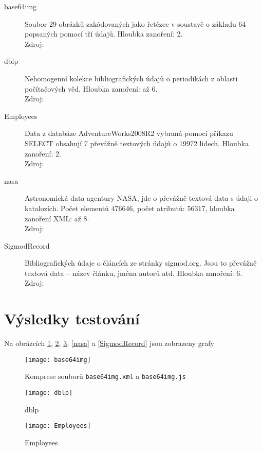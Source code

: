 \begin{description}
\item[base64img]Soubor 29 obrázků zakódovaných jako řetězec v soustavě o základu 64 popsaných pomocí tří údajů. Hloubka zanoření: 2.\\
Zdroj: %
\item[dblp]
Nehomogenní kolekce bibliografických údajů o periodikách z oblasti počítačových věd. Hloubka zanoření: až 6.\\
Zdroj: %
\item[Employees]
Data z databáze AdventureWorks2008R2 vybraná pomocí příkazu SELECT obsahují 7 převážně textových údajů o 19972 lidech. Hloubka zanoření: 2.\\
Zdroj: %
\item[nasa]
Astronomická data agentury NASA, jde o převážně textová data s údaji o katalozích. Počet elementů 476646, počet atributů: 56317, hloubka zanoření XML: až 8.\\
Zdroj: %
\item[SigmodRecord]
Bibliografických údaje o článcích ze stránky sigmod.org. Jsou to převážně textová data -- název článku, jména autorů atd. Hloubka zanoření: 6.\\
Zdroj: %
\end{description}

\section{Výsledky testování}
Na obrázcích \ref{base64img}, \ref{dblp}, \ref{Employees}, \ref{nasa} a \ref{SigmodRecord} jsou zobrazeny grafy

\begin{figure}[!h]
\centering
\texttt{[image: base64img]}
\caption{Komprese souborů \texttt{base64img.xml} a \texttt{base64img.js}}
\label{base64img}
\end{figure}

\begin{figure}[!h]
\centering
\texttt{[image: dblp]}
\caption{dblp}
\label{dblp}
\end{figure}

\begin{figure}[!h]
\centering
\texttt{[image: Employees]}
\caption{Employees}
\label{Employees}
\end{figure}

